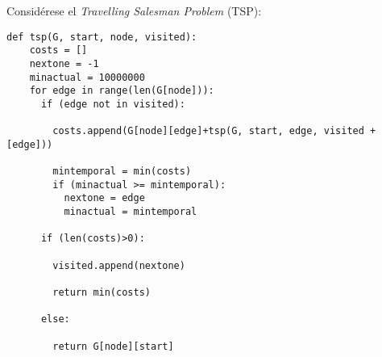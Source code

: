 




\begin{problema}
    Considérese el \textit{Travelling Salesman Problem} (TSP):
\begin{verbatim}def tsp(G, start, node, visited):
    costs = []
    nextone = -1
    minactual = 10000000
    for edge in range(len(G[node])):
      if (edge not in visited):

        costs.append(G[node][edge]+tsp(G, start, edge, visited + [edge]))
  
        mintemporal = min(costs)
        if (minactual >= mintemporal):
          nextone = edge
          minactual = mintemporal
  
      if (len(costs)>0):
  
        visited.append(nextone)
  
        return min(costs)
        
      else:
  
        return G[node][start]
  
\end{verbatim}


\end{problema}
